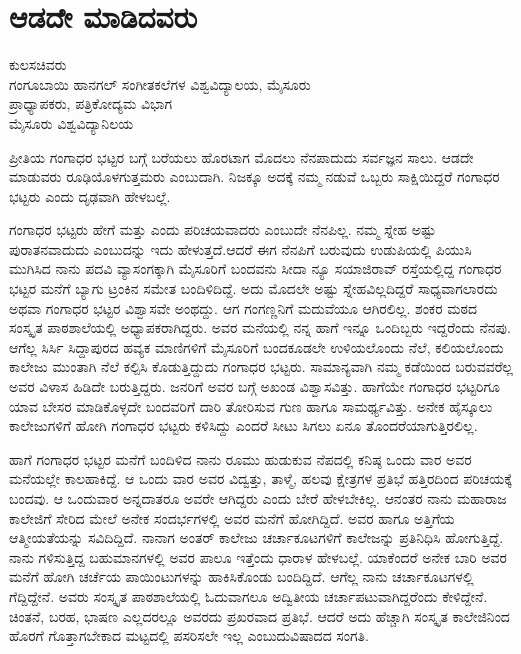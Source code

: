 {\fontsize{14}{16}\selectfont
\chapter{ಆಡದೇ ಮಾಡಿದವರು}

\begin{center}
\smallskip

ಕುಲಸಚಿವರು \\ಗಂಗೂಬಾಯಿ ಹಾನಗಲ್ ಸಂಗೀತಕಲೆಗಳ ವಿಶ್ವವಿದ್ಯಾಲಯ, ಮೈಸೂರು\\
ಪ್ರಾಧ್ಯಾಪಕರು, ಪತ್ರಿಕೋದ್ಯಮ ವಿಭಾಗ\\
ಮೈಸೂರು ವಿಶ್ವವಿದ್ಯಾನಿಲಯ
\addrule
\end{center}
ಪ್ರೀತಿಯ ಗಂಗಾಧರ ಭಟ್ಟರ ಬಗ್ಗೆ ಬರೆಯಲು ಹೊರಟಾಗ ಮೊದಲು ನೆನಪಾದುದು ಸರ್ವಜ್ಞನ ಸಾಲು. ಆಡದೇ ಮಾಡುವರು ರೂಢಿಯೊಳಗುತ್ತಮರು ಎಂಬುದಾಗಿ. ನಿಜಕ್ಕೂ ಅದಕ್ಕೆ ನಮ್ಮ ನಡುವೆ ಒಬ್ಬರು ಸಾಕ್ಷಿಯಿದ್ದರೆ ಗಂಗಾಧರ ಭಟ್ಟರು ಎಂದು ದೃಢವಾಗಿ ಹೇಳಬಲ್ಲೆ.

ಗಂಗಾಧರ ಭಟ್ಟರು ಹೇಗೆ ಮತ್ತು ಎಂದು ಪರಿಚಯವಾದರು ಎಂಬುದೇ ನೆನಪಿಲ್ಲ. ನಮ್ಮ ಸ್ನೇಹ ಅಷ್ಟು ಪುರಾತನವಾದುದು ಎಂಬುದನ್ನು ಇದು ಹೇಳುತ್ತದೆ.ಆದರೆ  ಈಗ ನೆನಪಿಗೆ ಬರುವುದು ಉಡುಪಿಯಲ್ಲಿ ಪಿಯುಸಿ ಮುಗಿಸಿದ ನಾನು ಪದವಿ ವ್ಯಾಸಂಗಕ್ಕಾಗಿ ಮೈಸೂರಿಗೆ ಬಂದವನು ಸೀದಾ ನ್ಯೂ ಸಯಾಜಿರಾವ್ ರಸ್ತೆಯಲ್ಲಿದ್ದ ಗಂಗಾಧರ ಭಟ್ಟರ ಮನೆಗೆ ಬ್ಯಾಗು ಟ್ರಂಕಿನ ಸಮೇತ ಬಂದಿಳಿದಿದ್ದೆ. ಅದು ಮೊದಲೇ ಅಷ್ಟು ಸ್ನೇಹವಿಲ್ಲದಿದ್ದರೆ ಸಾಧ್ಯವಾಗಲಾರದು ಅಥವಾ ಗಂಗಾಧರ ಭಟ್ಟರ ವಿಶ್ವಾಸವೇ ಅಂಥದ್ದು. ಆಗ ಗಂಗಣ್ಣನಿಗೆ ಮದುವೆಯೂ ಆಗಿರಲಿಲ್ಲ. ಶಂಕರ ಮಠದ ಸಂಸ್ಕೃತ ಪಾಠಶಾಲೆಯಲ್ಲಿ ಅಧ್ಯಾಪಕರಾಗಿದ್ದರು. ಅವರ ಮನೆಯಲ್ಲಿ ನನ್ನ ಹಾಗೆ ಇನ್ನೂ ಒಂದಿಬ್ಬರು ಇದ್ದರೆಂದು ನೆನಪು. ಆಗೆಲ್ಲ ಸಿರ್ಸಿ  \enginline{-}  ಸಿದ್ದಾಪುರದ ಹವ್ಯಕ ಮಾಣಿಗಳಿಗೆ ಮೈಸೂರಿಗೆ ಬಂದಕೂಡಲೇ ಉಳಿಯಲೊಂದು ನೆಲೆ, ಕಲಿಯಲೊಂದು ಕಾಲೇಜು ಮುಂತಾಗಿ ನೆಲೆ ಕಲ್ಪಿಸಿ ಕೊಡುತ್ತಿದ್ದುದು ಗಂಗಾಧರ ಭಟ್ಟರು. ಸಾಮಾನ್ಯವಾಗಿ ನಮ್ಮ ಕಡೆಯಿಂದ ಬರುವವರೆಲ್ಲ ಅವರ  ವಿಳಾಸ ಹಿಡಿದೇ ಬರುತ್ತಿದ್ದರು. ಜನರಿಗೆ ಅವರ ಬಗ್ಗೆ ಅಖಂಡ ವಿಶ್ವಾಸವಿತ್ತು. ಹಾಗೆಯೇ ಗಂಗಾಧರ ಭಟ್ಟರಿಗೂ ಯಾವ ಬೇಸರ ಮಾಡಿಕೊಳ್ಳದೇ ಬಂದವರಿಗೆ ದಾರಿ ತೋರಿಸುವ ಗುಣ ಹಾಗೂ ಸಾಮರ್ಥ್ಯವಿತ್ತು. ಅನೇಕ ಹೈಸ್ಕೂಲು ಕಾಲೇಜುಗಳಿಗೆ ಹೋಗಿ ಗಂಗಾಧರ ಭಟ್ಟರು ಕಳಿಸಿದ್ದು ಎಂದರೆ ಸೀಟು ಸಿಗಲು ಏನೂ ತೊಂದರೆಯಾಗುತ್ತಿರಲಿಲ್ಲ.

ಹಾಗೆ ಗಂಗಾಧರ ಭಟ್ಟರ ಮನೆಗೆ ಬಂದಿಳಿದ ನಾನು ರೂಮು ಹುಡುಕುವ \hbox{ನೆಪದಲ್ಲಿ} ಕನಿಷ್ಠ ಒಂದು ವಾರ ಅವರ ಮನೆಯಲ್ಲೇ ಕಾಲಹಾಕಿದ್ದೆ. ಆ ಒಂದು ವಾರ ಅವರ ವಿದ್ವತ್ತು, ತಾಳ್ಮೆ, ಹಲವು ಕ್ಷೇತ್ರಗಳ ಪ್ರತಿಭೆ ಹತ್ತಿರದಿಂದ ಪರಿಚಯಕ್ಕೆ ಬಂದವು. ಆ ಒಂದುವಾರ ಅನ್ನದಾತರೂ ಅವರೇ ಆಗಿದ್ದರು ಎಂದು ಬೇರೆ ಹೇಳಬೇಕಿಲ್ಲ. ಆನಂತರ ನಾನು ಮಹಾರಾಜ ಕಾಲೇಜಿಗೆ ಸೇರಿದ ಮೇಲೆ ಅನೇಕ ಸಂದರ್ಭಗಳಲ್ಲಿ ಅವರ ಮನೆಗೆ ಹೋಗಿದ್ದಿದೆ. ಅವರ ಹಾಗೂ ಅತ್ತಿಗೆಯ ಆತ್ಮೀಯತೆಯನ್ನು ಸವಿದಿದ್ದಿದೆ. ನಾನಾಗ ಅಂತರ್ ಕಾಲೇಜು ಚರ್ಚಾಕೂಟಗಳಿಗೆ ಕಾಲೇಜನ್ನು ಪ್ರತಿನಿಧಿಸಿ ಹೋಗುತ್ತಿದ್ದೆ. ನಾನು ಗಳಿಸುತ್ತಿದ್ದ ಬಹುಮಾನಗಳಲ್ಲಿ ಅವರ ಪಾಲೂ ಇತ್ತೆಂದು ಧಾರಾಳ ಹೇಳಬಲ್ಲೆ. ಯಾಕೆಂದರೆ ಅನೇಕ ಬಾರಿ ಅವರ ಮನೆಗೆ ಹೋಗಿ ಚರ್ಚೆಯ ಪಾಯಿಂಟುಗಳನ್ನು ಹಾಕಿಸಿಕೊಂಡು ಬಂದಿದ್ದಿದೆ. ಆಗೆಲ್ಲ ನಾನು ಚರ್ಚಾಕೂಟಗಳಲ್ಲಿ ಗೆದ್ದಿದ್ದೇನೆ. ಅವರು ಸಂಸ್ಕೃತ ಪಾಠಶಾಲೆಯಲ್ಲಿ ಓದುವಾಗಲೂ ಅದ್ವಿತೀಯ ಚರ್ಚಾಪಟುವಾಗಿದ್ದರೆಂದು ಕೇಳಿದ್ದೇನೆ. ಚಿಂತನೆ, ಬರಹ, ಭಾಷಣ ಎಲ್ಲದರಲ್ಲೂ ಅವರದು ಪ್ರಖರವಾದ ಪ್ರತಿಭೆ. ಆದರೆ ಅದು ಹೆಚ್ಚಾಗಿ ಸಂಸ್ಕೃತ ಕಾಲೇಜಿನಿಂದ ಹೊರಗೆ ಗೊತ್ತಾಗಬೇಕಾದ ಮಟ್ಟದಲ್ಲಿ ಪಸರಿಸಲೇ ಇಲ್ಲ ಎಂಬುದು\break ವಿಷಾದದ ಸಂಗತಿ.

}
